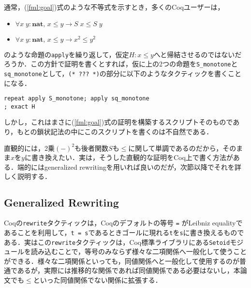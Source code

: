 \documentclass[submit]{ipsj}
\begin{document}
通常，(\ref{fml:goal})式のような不等式を示すとき，多くのCoqユーザーは，
\begin{itemize}
\item $\forall x\;y : \mathbf{nat}, \, x \leq y \to S\;x \leq S\;y$
\item $\forall x\;y : \mathbf{nat}, \, x \leq y \to x^2 \leq y^2$
\end{itemize}
のような命題の\verb+apply+を繰り返して，仮定$H : x \leq y$へと帰結させるのではないだろうか．この方針で証明を書くとすれば，仮に上の2つの命題を\verb+S_monotone+と\verb+sq_monotone+として，\verb+(* ??? *)+の部分に以下のようなタクティックを書くことになる．
\begin{mdframed}[leftmargin=10pt, rightmargin=10pt, skipabove=10pt, skipbelow=10pt]
\begin{verbatim}
repeat apply S_monotone; apply sq_monotone
; exact H
\end{verbatim}
\end{mdframed}
しかし，これはまさに(\ref{fml:goal})式の証明を構築するスクリプトそのものであり，もとの鎖状記法の中にこのスクリプトを書くのは不自然である．

直観的には，2乗$(-)^2$も後者関数$S$も$\leq$に関して単調であるのだから，そのまま$x$を$y$に書き換えたい．実は，そうした直観的な証明をCoq上で書く方法がある．端的にはgeneralized rewritingを用いれば良いのだが，次節以降でそれを詳しく説明する．

\subsection{Generalized Rewriting}

Coqの\verb+rewrite+タクティックは，Coqのデフォルトの等号  \verb+=+ がLeibniz equalityであることを利用して，\verb+t = s+であるときゴールに現れる\verb+t+を\verb+s+に書き換えるものである．実はこの\verb+rewrite+タクティックは，Coq標準ライブラリにある\verb+Setoid+モジュールを読み込むことで，等号のみならず様々な二項関係へ一般化して使うことができる．様々な二項関係といっても，同値関係へと一般化して使用するのが普通であるが，実際には推移的な関係であれば同値関係である必要はないし，本論文でも$\leq$といった同値関係でない関係に拡張する．
\end{document}
